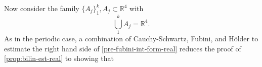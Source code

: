 \documentclass[12pt,reqno]{amsart}
\numberwithin{equation}{section}  %
\numberwithin{figure}{section}
\newcommand{\rr}{\mathbb{R}}
\theoremstyle{plain}
\theoremstyle{definition}
\theoremstyle{remark}
\begin{document}
%
%
Now consider the family $\{A_{j}\}_{1}^{k}, A_{j} \subset \rr^{4}$ with
$$\bigcup_{1}^{k} A_{j}= \rr^{4}.$$ 
As in the periodic case, a combination of Cauchy-Schwartz, Fubini, and
H{\"o}lder to estimate the right hand side of \eqref{pre-fubini-int-form-real}
reduces the proof of \autoref{prop:bilin-est-real} to showing that
\end{document}
